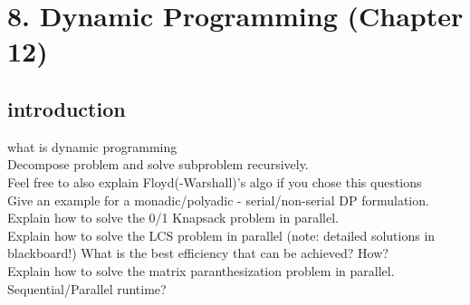 \documentclass[a4paper,10pt,titlepage]{report}
\begin{document}
\newpage
\section{
8. Dynamic Programming (Chapter 12)}
\subsection{introduction}
	what is dynamic programming\\
    	Decompose problem and solve subproblem recursively.\\
        
        
   Feel free to also explain Floyd(-Warshall)'s algo if you chose this questions\\
   Give an example for a monadic/polyadic - serial/non-serial DP formulation.\\
   Explain how to solve the 0/1 Knapsack problem in parallel.\\
   Explain how to solve the LCS problem in parallel (note: detailed solutions in blackboard!) What is the best efficiency that can be achieved? How?\\
   Explain how to solve the matrix paranthesization problem in parallel. Sequential/Parallel runtime?\\
\end{document}
